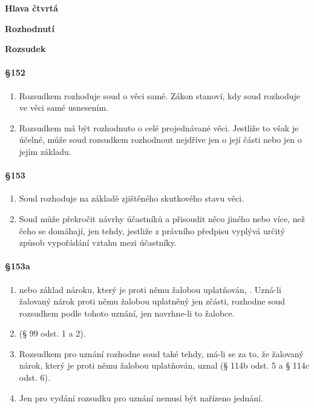 \textbf{\Large Hlava čtvrtá}

\textbf{\Large Rozhodnutí}

\textbf{\Large Rozsudek}

\paragraph{\S 152}

\begin{enumerate}[label={(\arabic*)}]
\item Rozsudkem rozhoduje soud o věci samé. Zákon stanoví, kdy soud rozhoduje ve věci samé usnesením. 
\item Rozsudkem má být rozhodnuto o celé projednávané věci. Jestliže to však je účelné, může soud rozsudkem rozhodnout nejdříve jen o její části nebo jen o jejím základu.
\end{enumerate}

\paragraph{\S 153}

\begin{enumerate}[label={(\arabic*)}]
  \item Soud rozhoduje na základě zjištěného skutkového stavu věci.
  \item Soud může překročit návrhy účastníků a přisoudit něco jiného nebo více, než čeho se domáhají, jen tehdy, jestliže z právního předpisu vyplývá určitý způsob vypořádání vztahu mezi účastníky.
\end{enumerate}

\paragraph{\S 153a}

\begin{enumerate}[label={(\arabic*)}]
  \item {} nebo základ nároku, který je proti němu žalobou uplatňován, . Uzná-li žalovaný nárok proti němu žalobou uplatněný jen zčásti, rozhodne soud rozsudkem podle tohoto uznání, jen navrhne-li to žalobce.
  \item {} (§ 99 odst. 1 a 2).
  \item Rozsudkem pro uznání rozhodne soud také tehdy, má-li se za to, že žalovaný nárok, který je proti němu žalobou uplatňován, uznal (§ 114b odst. 5 a § 114c odst. 6).
  \item Jen pro vydání rozsudku pro uznání nemusí být nařízeno jednání.
\end{enumerate}

